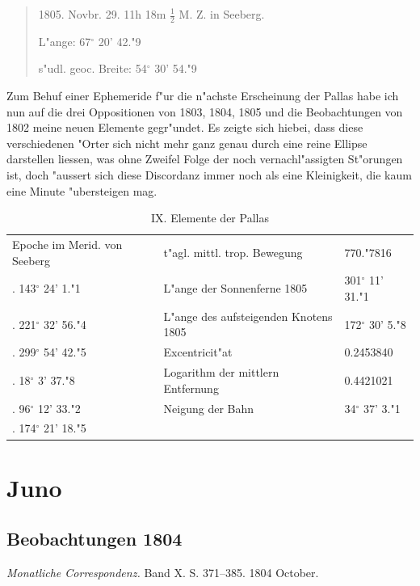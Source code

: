 \documentclass[12pt,a4paper]{article}
\begin{document}
\begin{quote}
1805. Novbr. 29. 11h 18m $\frac{1}{2}$ M. Z. in Seeberg.

L"ange: 67$^\circ$ 20' 42."9

s"udl. geoc. Breite: 54$^\circ$ 30' 54."9
\end{quote}

Zum Behuf einer Ephemeride f"ur die n"achste Erscheinung der Pallas habe ich nun auf die drei Oppositionen von 1803, 1804, 1805 und die Beobachtungen von 1802 meine neuen Elemente gegr"undet. Es zeigte sich hiebei, dass diese verschiedenen "Orter sich nicht mehr ganz genau durch eine reine Ellipse darstellen liessen, was ohne Zweifel Folge der noch vernachl"assigten St"orungen ist, doch "aussert sich diese Discordanz immer noch als eine Kleinigkeit, die kaum eine Minute "ubersteigen mag.

\begin{table}[H]
\centering
\begin{tabular}{l l | l l}
\toprule
Epoche im Merid. von Seeberg & & t"agl. mittl. trop. Bewegung & 770."7816 \\
\quad 1802. 143$^\circ$ 24' 1."1 & & L"ange der Sonnenferne 1805 & 301$^\circ$ 11' 31."1 \\
\quad 1803. 221$^\circ$ 32' 56."4 & & L"ange des aufsteigenden Knotens 1805 & 172$^\circ$ 30' 5."8 \\
\quad 1804. 299$^\circ$ 54' 42."5 & & Excentricit"at & 0.2453840 \\
\quad 1805. 18$^\circ$ 3' 37."8 & & Logarithm der mittlern Entfernung & 0.4421021 \\
\quad 1806. 96$^\circ$ 12' 33."2 & & Neigung der Bahn & 34$^\circ$ 37' 3."1 \\
\quad 1807. 174$^\circ$ 21' 18."5 & & & \\
\bottomrule
\end{tabular}
\caption{IX. Elemente der Pallas}
\end{table}

\section{Juno}

\subsection{Beobachtungen 1804}

\textit{Monatliche Correspondenz.} Band X. S. 371--385. 1804 October.
\end{document}
